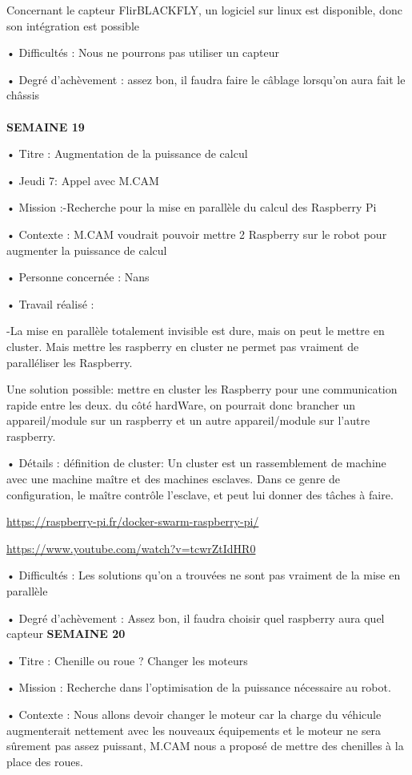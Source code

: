 \documentclass{PackagerQualityN}
\begin{document}
Concernant le capteur FlirBLACKFLY, un logiciel sur linux est disponible, donc son intégration est possible


• Difficultés : Nous ne pourrons pas utiliser un capteur

• Degré d’achèvement : assez bon, il faudra faire le câblage lorsqu’on aura fait le châssis
\\\\
\textbf{SEMAINE 19} 

• Titre : Augmentation de la puissance de calcul

• Jeudi 7: Appel avec M.CAM

• Mission :-Recherche pour la mise en parallèle du calcul des Raspberry Pi

• Contexte : M.CAM voudrait pouvoir mettre 2 Raspberry sur le robot pour augmenter la puissance de calcul

• Personne concernée : Nans

• Travail réalisé :

-La mise en parallèle totalement invisible est dure, mais on peut le mettre en cluster.
Mais mettre les raspberry en cluster ne permet pas vraiment de paralléliser les Raspberry.

Une solution possible: mettre en cluster les Raspberry pour une communication rapide entre les deux. du côté hardWare, on pourrait donc brancher un appareil/module sur un raspberry et un autre appareil/module sur l’autre raspberry.


• Détails : 
définition de cluster: Un cluster est un rassemblement de machine avec une machine maître et des machines esclaves. Dans ce genre de configuration, le maître contrôle l’esclave, et peut lui donner des tâches à faire.

\url{https://raspberry-pi.fr/docker-swarm-raspberry-pi/}


\url{https://www.youtube.com/watch?v=tcwrZtIdHR0}
 	

• Difficultés : Les solutions qu’on a trouvées ne sont pas vraiment de la mise en parallèle


• Degré d’achèvement : Assez bon, il faudra choisir quel raspberry aura quel capteur
\newp
\textbf{SEMAINE 20}

• Titre : Chenille ou roue ? Changer les moteurs

• Mission : Recherche dans l’optimisation de la puissance nécessaire au robot.

• Contexte : Nous allons devoir changer le moteur car la charge du véhicule augmenterait nettement avec les nouveaux équipements et le moteur ne sera sûrement pas assez puissant, M.CAM  nous a proposé de mettre des chenilles à la place des roues.
\end{document}
